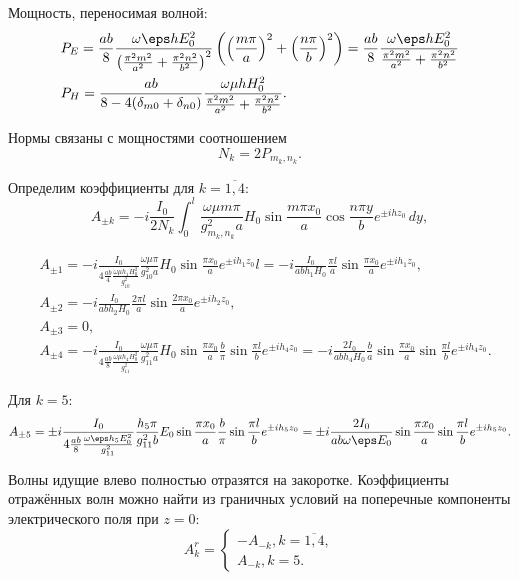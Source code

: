 \documentclass[a4paper,12pt]{extarticle}
\begin{document}
	Мощность, переносимая волной:
	\begin{align*}
		& P_E = \frac{ab}{8}\frac{\omega\eps h E_0^2}{\left(\frac{\pi^2m^2}{a^2} + \frac{\pi^2n^2}{b^2}\right)^2}\left( \left(\frac{m\pi}{a}\right)^2 + \left(\frac{n\pi}{b}\right)^2 \right) = \frac{ab}{8}\frac{\omega\eps h E_0^2}{\frac{\pi^2m^2}{a^2} + \frac{\pi^2n^2}{b^2}} \\
		& P_H =
			\frac{ab}{8-4(\delta_{m0}+\delta_{n0})}\frac{\omega\mu h H_0^2}{\frac{\pi^2m^2}{a^2} + \frac{\pi^2n^2}{b^2}}.
	\end{align*}

	Нормы связаны с мощностями соотношением
	\[
		N_k = 2P_{m_k,n_k}.
	\]

	Определим коэффициенты для \( k = \overline{1,4} \):
	\[
		A_{\pm k} = -i\frac{I_0}{2N_k} \int_0^l \frac{\omega\mu m\pi}{g_{m_k,n_k}^2a}H_0\sin\frac{m\pi x_0}{a}\cos\frac{n\pi y}{b}e^{\pm ihz_0}\,dy,
	\]

	\begin{align*}
		& A_{\pm 1} = -i\frac{I_0}{4\frac{ab}{4}\frac{\omega\mu h_1 H_0^2}{g_{10}^2}} \frac{\omega\mu \pi}{g_{10}^2a}H_0\sin\frac{\pi x_0}{a}e^{\pm ih_1z_0}l = -i\frac{I_0}{ab h_1 H_0} \frac{\pi l}{a}\sin\frac{\pi x_0}{a}e^{\pm ih_1z_0},\\
		& A_{\pm 2} = -i\frac{I_0}{ab h_2 H_0} \frac{2\pi l}{a}\sin\frac{2\pi x_0}{a}e^{\pm ih_2z_0},\\
		& A_{\pm 3} = 0,\\
		& A_{\pm 4} = -i\frac{I_0}{4\frac{ab}{8}\frac{\omega\mu h_4 H_0^2}{g_{11}^2}} \frac{\omega\mu \pi}{g_{11}^2a}H_0\sin\frac{\pi x_0}{a}\frac{b}{\pi}\sin\frac{\pi l}{b}e^{\pm ih_4z_0} = -i\frac{2I_0}{ab h_4 H_0} \frac{b}{a}\sin\frac{\pi x_0}{a}\sin\frac{\pi l}{b}e^{\pm ih_4z_0}.
	\end{align*}

	Для \( k = 5 \):
	\[
		A_{\pm 5} =  \pm i\frac{I_0}{4\frac{ab}{8}\frac{\omega\eps h_5 E_0^2}{g_{11}^2}}\frac{h_5\pi}{g_{11}^2b}E_0\sin\frac{\pi x_0}{a}\frac{b}{\pi}\sin\frac{\pi l}{b}e^{\pm ih_5z_0} = \pm i \frac{2I_0}{ab\omega\eps E_0} \sin\frac{\pi x_0}{a}\sin\frac{\pi l}{b}e^{\pm ih_5z_0}.
	\]

	Волны идущие влево полностью отразятся на закоротке. Коэффициенты отражённых волн можно найти из граничных условий на поперечные компоненты электрического поля при \( z=0 \):
	\[
		A_k^r = \begin{cases}
			-A_{-k}, k=\overline{1,4},\\
			A_{-k}, k=5.
		\end{cases}
	\]
\end{document}
